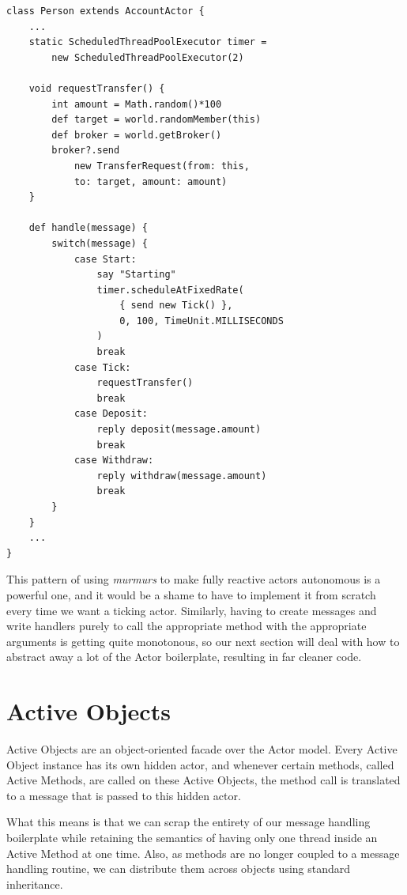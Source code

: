 \documentclass[a4paper,12pt]{kth-mag}
\begin{document}
\begin{listing}[H]
	\begin{verbatim}
class Person extends AccountActor {
    ...
    static ScheduledThreadPoolExecutor timer = 
        new ScheduledThreadPoolExecutor(2)

    void requestTransfer() {
        int amount = Math.random()*100
        def target = world.randomMember(this)
        def broker = world.getBroker()
        broker?.send 
            new TransferRequest(from: this, 
            to: target, amount: amount)
    }

    def handle(message) { 
        switch(message) {
            case Start:
                say "Starting"
                timer.scheduleAtFixedRate(
                    { send new Tick() },
                    0, 100, TimeUnit.MILLISECONDS
                )
                break
            case Tick:
                requestTransfer()
                break
            case Deposit:
                reply deposit(message.amount)
                break
            case Withdraw: 
                reply withdraw(message.amount)
                break
        }
    }
    ...
}
	\end{verbatim}
\end{listing}

This pattern of using \textit{murmurs} to make fully reactive actors autonomous is a powerful one, and it would be a shame to have to implement it from scratch every time we want a ticking actor. Similarly, having to create messages and write handlers purely to call the appropriate method with the appropriate arguments is getting quite monotonous, so our next section will deal with how to abstract away a lot of the Actor boilerplate, resulting in far cleaner code.

\section{Active Objects}

Active Objects are an object-oriented facade over the Actor model. Every Active Object instance has its own hidden actor, and whenever certain methods, called Active Methods, are called on these Active Objects, the method call is translated to a message that is passed to this hidden actor.

What this means is that we can scrap the entirety of our message handling boilerplate while retaining the semantics of having only one thread inside an Active Method at one time. Also, as methods are no longer coupled to a message handling routine, we can distribute them across objects using standard inheritance.
\end{document}
